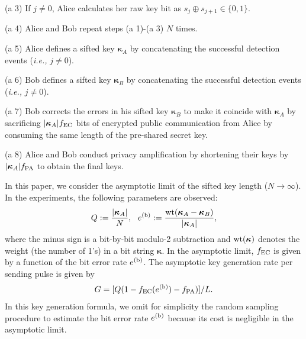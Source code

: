 \documentclass[prl,twocolumn,superscriptaddress,nofootinbib]{revtex4}
\def\U#1{{\rm #1}}
\begin{document}
  (a 3) If $j\neq0$, Alice calculates her raw key bit as $s_j\oplus s_{j+1}\in\{0,1\}$.

  (a 4) Alice and Bob repeat steps (a 1)-(a 3) $N$ times.

  (a 5) Alice defines a sifted key $\bm{\kappa}_A$ by concatenating the successful detection events ({\it i.e.,} $j\neq0$).

  (a 6) Bob defines a sifted key $\bm{\kappa}_B$ by concatenating the successful detection events ({\it i.e.,} $j\neq0$). 

  (a 7) Bob corrects the errors in his sifted key $\bm{\kappa}_B$ to make it coincide with $\bm{\kappa}_A$ by sacrificing
  $|\bm{\kappa}_A|f_{\U{EC}}$ bits of encrypted public communication from Alice by consuming the same length of the 
  pre-shared secret key.

  (a 8) Alice and Bob conduct privacy amplification by shortening their keys by $|\bm{\kappa}_A|f_{\U{PA}}$ to obtain the
  final keys.

  In this paper, we consider the asymptotic limit of the sifted key length ($N\rightarrow\infty$).
  In the experiments, the following parameters are observed:
  \begin{align}
Q:=\frac{|\bm{\kappa}_A|}{N},~~e^{(\U{b})}:=\frac{\U{wt}(\bm{\kappa}_A-\bm{\kappa}_B)}{|\bm{\kappa}_A|},
    \end{align}
  where the minus sign is a bit-by-bit modulo-2 subtraction and
  $\U{wt}(\bm{\kappa})$ denotes the weight (the number of 1's) in a bit string $\bm{\kappa}$. 
  In the asymptotic limit, $f_{\U{EC}}$ is given by a function of the bit error rate $e^{(\U{b})}$.
  The asymptotic key generation rate per sending pulse is given by~\cite{GLLP04,Koashi2009}
  \begin{align}
    G=
    [Q(1-f_{\U{EC}}(e^{(\U{b})})-f_{\U{PA}})]/L.\label{keyrate}
    \end{align}
  In this key generation formula,
  we omit for simplicity the random sampling procedure to estimate the bit error rate $e^{(\U{b})}$ because its cost is 
  negligible in the asymptotic limit. 
\end{document}

